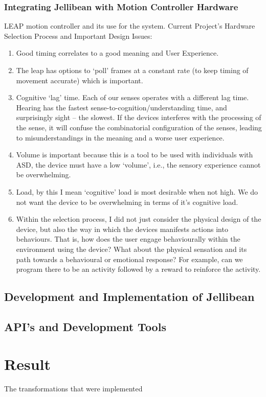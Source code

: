\documentclass[a4paper, 11pt]{article}
\begin{document}
\subsubsection{Integrating Jellibean with Motion Controller Hardware}
LEAP motion controller and its use for the system.
Current Project’s Hardware Selection Process and Important Design Issues:
\begin{enumerate}
\item{Good timing correlates to a good meaning and User Experience.}
\item{The leap has options to ‘poll’ frames at a constant rate (to keep timing of movement accurate) which is important.}
\item{Cognitive ‘lag’ time. Each of our senses operates with a different lag time. Hearing has the fastest sense-to-cognition/understanding time, and surprisingly sight -- the slowest. If the devices interferes with the processing of the sense, it will confuse the combinatorial configuration of the senses, leading to misunderstandings in the meaning and a worse user experience.}
\item{Volume is important because this is a tool to be used with individuals with ASD, the device must have a low `volume’, i.e., the sensory experience cannot be overwhelming.}
\item{Load, by this I mean `cognitive' load is most desirable when not high. We do not want the device to be overwhelming in terms of it’s cognitive load.}
\item{Within the selection process, I did not just consider the physical design of the device, but also the way in which the devices manifests actions into behaviours. That is, how does the user engage behaviourally within the environment using the device? What about the physical sensation and its path towards a behavioural or emotional response? For example, can we program there to be an activity followed by a reward to reinforce the activity.}
\end{enumerate}


\subsection{Development and Implementation of Jellibean}
\subsection{API's and Development Tools}


\section{Result}
The transformations that were implemented
\end{document}
